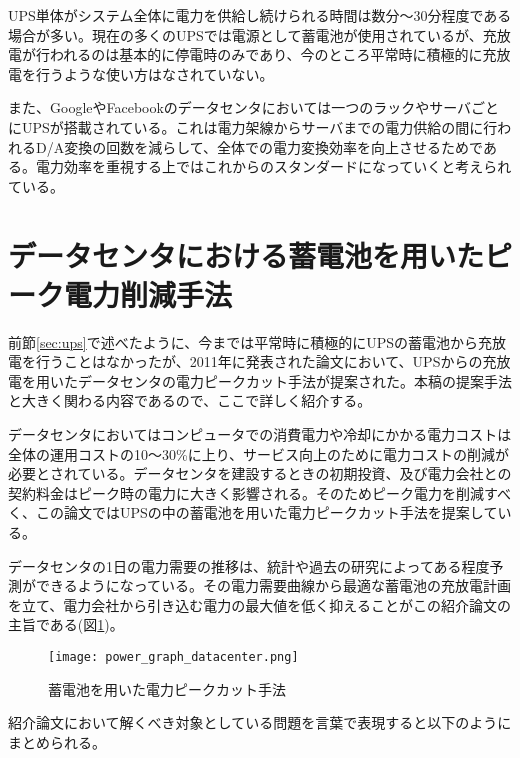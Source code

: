 UPS単体がシステム全体に電力を供給し続けられる時間は数分〜30分程度である場合が多い。現在の多くのUPSでは電源として蓄電池が使用されているが、充放電が行われるのは基本的に停電時のみであり、今のところ平常時に積極的に充放電を行うような使い方はなされていない。

また、GoogleやFacebookのデータセンタにおいては一つのラックやサーバごとにUPSが搭載されている\cite{Datacenter}。これは電力架線からサーバまでの電力供給の間に行われるD/A変換の回数を減らして、全体での電力変換効率を向上させるためである。電力効率を重視する上ではこれからのスタンダードになっていくと考えられている。


\section{データセンタにおける蓄電池を用いたピーク電力削減手法}
\label{sec:capping}

前節\ref{sec:ups}で述べたように、今までは平常時に積極的にUPSの蓄電池から充放電を行うことはなかったが、2011年に発表された論文\cite{Govindan:2011:BLT:2024723.2000105}において、UPSからの充放電を用いたデータセンタの電力ピークカット手法が提案された。本稿の提案手法と大きく関わる内容であるので、ここで詳しく紹介する。

データセンタにおいてはコンピュータでの消費電力や冷却にかかる電力コストは全体の運用コストの10〜30\%に上り、サービス向上のために電力コストの削減が必要とされている。データセンタを建設するときの初期投資、及び電力会社との契約料金はピーク時の電力に大きく影響される。そのためピーク電力を削減すべく、この論文ではUPSの中の蓄電池を用いた電力ピークカット手法を提案している。

データセンタの1日の電力需要の推移は、統計や過去の研究によってある程度予測ができるようになっている。その電力需要曲線から最適な蓄電池の充放電計画を立て、電力会社から引き込む電力の最大値を低く抑えることがこの紹介論文の主旨である(図\ref{fig:power_graph_datacenter})。
\begin{figure}[t]
 \begin{center}
  \texttt{[image: power\_graph\_datacenter.png]}
 \end{center}
 \caption{蓄電池を用いた電力ピークカット手法}
 \label{fig:power_graph_datacenter}
\end{figure}

紹介論文において解くべき対象としている問題を言葉で表現すると以下のようにまとめられる。

